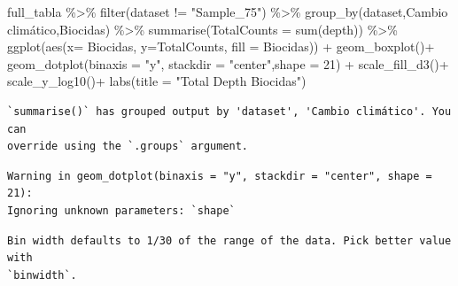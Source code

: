 \documentclass[
  letterpaper,
  DIV=11,
  numbers=noendperiod]{scrartcl}
\newenvironment{Shaded}{\begin{snugshade}}{\end{snugshade}}
\newcommand{\AttributeTok}[1]{\textcolor[rgb]{0.40,0.45,0.13}{#1}}
\newcommand{\DecValTok}[1]{\textcolor[rgb]{0.68,0.00,0.00}{#1}}
\newcommand{\FunctionTok}[1]{\textcolor[rgb]{0.28,0.35,0.67}{#1}}
\newcommand{\NormalTok}[1]{\textcolor[rgb]{0.00,0.23,0.31}{#1}}
\newcommand{\SpecialCharTok}[1]{\textcolor[rgb]{0.37,0.37,0.37}{#1}}
\newcommand{\StringTok}[1]{\textcolor[rgb]{0.13,0.47,0.30}{#1}}
\begin{document}
\begin{Shaded}
\begin{Highlighting}[]
\NormalTok{full\_tabla }\SpecialCharTok{\%\textgreater{}\%} \FunctionTok{filter}\NormalTok{(dataset }\SpecialCharTok{!=} \StringTok{"Sample\_75"}\NormalTok{) }\SpecialCharTok{\%\textgreater{}\%} 
  \FunctionTok{group\_by}\NormalTok{(dataset,}\StringTok{\textasciigrave{}}\AttributeTok{Cambio climático}\StringTok{\textasciigrave{}}\NormalTok{,Biocidas) }\SpecialCharTok{\%\textgreater{}\%} 
  \FunctionTok{summarise}\NormalTok{(}\AttributeTok{TotalCounts =} \FunctionTok{sum}\NormalTok{(depth)) }\SpecialCharTok{\%\textgreater{}\%} 
  \FunctionTok{ggplot}\NormalTok{(}\FunctionTok{aes}\NormalTok{(}\AttributeTok{x=}\NormalTok{ Biocidas, }\AttributeTok{y=}\NormalTok{TotalCounts, }\AttributeTok{fill =}\NormalTok{ Biocidas)) }\SpecialCharTok{+} 
  \FunctionTok{geom\_boxplot}\NormalTok{()}\SpecialCharTok{+}
  \FunctionTok{geom\_dotplot}\NormalTok{(}\AttributeTok{binaxis =} \StringTok{"y"}\NormalTok{, }\AttributeTok{stackdir =} \StringTok{"center"}\NormalTok{,}\AttributeTok{shape =} \DecValTok{21}\NormalTok{) }\SpecialCharTok{+}
  \FunctionTok{scale\_fill\_d3}\NormalTok{()}\SpecialCharTok{+}
  \FunctionTok{scale\_y\_log10}\NormalTok{()}\SpecialCharTok{+}
  \FunctionTok{labs}\NormalTok{(}\AttributeTok{title =} \StringTok{"Total Depth Biocidas"}\NormalTok{)}
\end{Highlighting}
\end{Shaded}

\begin{verbatim}
`summarise()` has grouped output by 'dataset', 'Cambio climático'. You can
override using the `.groups` argument.
\end{verbatim}

\begin{verbatim}
Warning in geom_dotplot(binaxis = "y", stackdir = "center", shape = 21):
Ignoring unknown parameters: `shape`
\end{verbatim}

\begin{verbatim}
Bin width defaults to 1/30 of the range of the data. Pick better value with
`binwidth`.
\end{verbatim}
\end{document}
